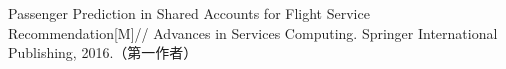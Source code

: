 
\begin{publications}{99}
    \item Passenger Prediction in Shared Accounts for Flight Service Recommendation[M]// Advances in Services Computing. Springer International Publishing, 2016.（第一作者）
\end{publications}
